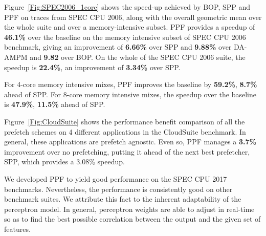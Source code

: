 
Figure~\ref{Fig:SPEC2006_1core} shows the speed-up achieved by BOP, SPP and
PPF on traces from SPEC CPU 2006, along with the overall geometric mean over
the whole suite and over a memory-intensive subset.  PPF provides a speedup of
\textbf{46.1\%} over the baseline on the memory intensive subset of SPEC CPU
2006 benchmark, giving an improvement of \textbf{6.66\%} over SPP and
\textbf{9.88\%} over DA-AMPM and \textbf{9.82} over BOP.  On the whole of 
the SPEC CPU 2006 suite, the speedup is \textbf{22.4\%}, an improvement 
of \textbf{3.34\%} over SPP.

For 4-core memory intensive mixes, PPF improves the baseline by
\textbf{59.2\%}, \textbf{8.7\%} ahead of SPP. For 8-core memory intensive
mixes, the speedup over the baseline is \textbf{47.9\%}, \textbf{11.5\%} ahead
of SPP.

Figure~\ref{Fig:CloudSuite} shows the performance benefit comparison of all
the prefetch schemes on 4 different applications in the CloudSuite benchmark.
In general, these applications are prefetch agnostic. Even so, PPF manages a
\textbf{3.7\%} improvement over no prefetching, putting it ahead of the next
best prefetcher, SPP, which provides a 3.08\% speedup.

We developed PPF to yield good performance on the SPEC CPU 2017 benchmarks.
Nevertheless, the performance is consistently good on other benchmark suites.
We attribute this fact to the inherent adaptability of the perceptron model.
In general, perceptron weights are able to adjust in real-time so as to find
the best possible correlation between the output and the given set of
features.
